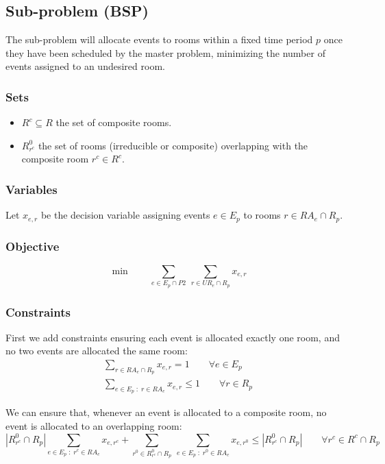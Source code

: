 \documentclass{article}
\theoremstyle{plain}
\numberwithin{theorem}{section}
\numberwithin{example}{section}
\theoremstyle{definition}
\begin{document}
\subsection{Sub-problem (BSP)}\label{BSP}
The sub-problem will allocate events to rooms within a fixed time period $p$
once they have been scheduled by the master problem, minimizing the number of
events assigned to an undesired room.

\subsubsection*{Sets}
\begin{itemize}
    \item $R^c \subseteq R$ the set of composite rooms.
    \item $R^0_{r^c}$ the set of rooms (irreducible or composite) overlapping
        with the composite room $r^c \in R^c$.
\end{itemize}

\subsubsection*{Variables}
Let $x_{e,r}$ be the decision variable assigning events $e \in E_p$ to rooms $r
\in RA_e \cap R_p$.

\subsubsection*{Objective}
\begin{equation}
    \min \qquad \sum_{e \in E_p \cap P2} \
        \sum_{r \in UR_e \cap R_p} x_{e,r}
\end{equation}

\subsubsection*{Constraints}
First we add constraints ensuring each event is allocated exactly one room, and
no two events are allocated the same room:
\begin{gather}
    \sum_{r \in RA_e \cap R_p} x_{e,r} = 1 \qquad \forall e \in E_p \\
    \sum_{e \in E_p \; : \; r \in RA_e} x_{e, r} \leq 1 \qquad \forall r \in R_p
\end{gather}

We can ensure that, whenever an event is allocated to a composite room, no event
is allocated to an overlapping room:
\begin{equation}
    |R^0_{r^c} \cap R_p| \sum_{e \in E_p \; : \; r^c \in RA_e} x_{e, r^c}
        + \sum_{r^0 \in R^0_{r^c} \cap R_p} \ \sum_{e \in E_p \; : \; r^0 \in RA_e}
        x_{e, r^0} \leq |R^0_{r^c} \cap R_p| \qquad \forall r^c \in R^c \cap R_p
\end{equation}
\end{document}

